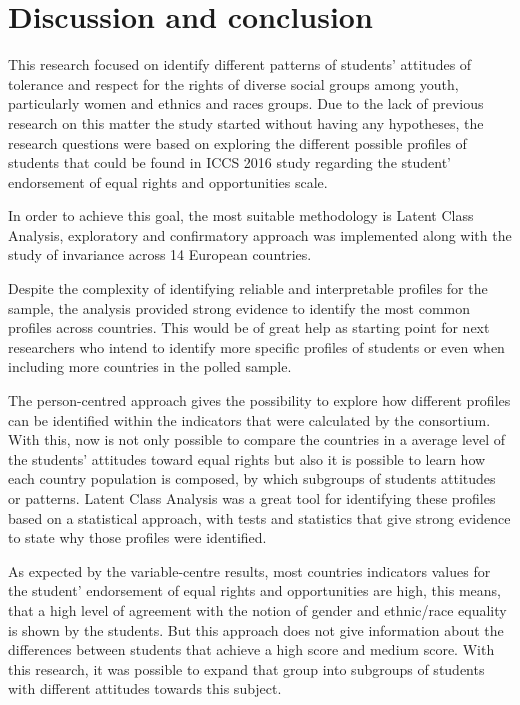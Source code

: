 \documentclass[12pt,a4paper,oneside]{reedthesis}
\begin{document}
\clearpage

\hypertarget{discussion-and-conclusion}{%
\chapter{Discussion and conclusion}\label{discussion-and-conclusion}}

This research focused on identify different patterns of students' attitudes of tolerance and respect for the rights of diverse social groups among youth, particularly women and ethnics and races groups. Due to the lack of previous research on this matter the study started without having any hypotheses, the research questions were based on exploring the different possible profiles of students that could be found in ICCS 2016 study regarding the student' endorsement of equal rights and opportunities scale.

In order to achieve this goal, the most suitable methodology is Latent Class Analysis, exploratory and confirmatory approach was implemented along with the study of invariance across 14 European countries.

Despite the complexity of identifying reliable and interpretable profiles for the sample, the analysis provided strong evidence to identify the most common profiles across countries. This would be of great help as starting point for next researchers who intend to identify more specific profiles of students or even when including more countries in the polled sample.

The person-centred approach gives the possibility to explore how different profiles can be identified within the indicators that were calculated by the consortium. With this, now is not only possible to compare the countries in a average level of the students' attitudes toward equal rights but also it is possible to learn how each country population is composed, by which subgroups of students attitudes or patterns. Latent Class Analysis was a great tool for identifying these profiles based on a statistical approach, with tests and statistics that give strong evidence to state why those profiles were identified.

As expected by the variable-centre results, most countries indicators values for the student' endorsement of equal rights and opportunities are high, this means, that a high level of agreement with the notion of gender and ethnic/race equality is shown by the students. But this approach does not give information about the differences between students that achieve a high score and medium score. With this research, it was possible to expand that group into subgroups of students with different attitudes towards this subject.
\end{document}
